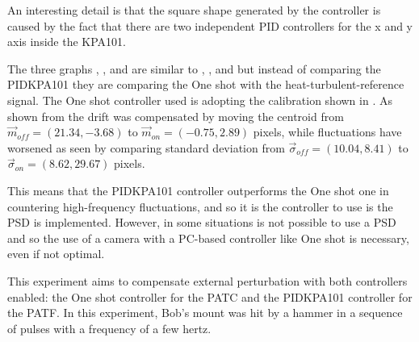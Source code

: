 An interesting detail is that the square shape generated by the controller is caused by the fact that there are two independent PID controllers for the x and y axis inside the KPA101.


The three graphs , , and  are similar to , , and  but instead of comparing the PIDKPA101 they are comparing the One shot with the heat-turbulent-reference signal. The One shot controller used is adopting the calibration shown in .
As shown from  the drift was compensated by moving the centroid from $\vec{m}_{off} = (21.34, -3.68)$ to $\vec{m}_{on} = (-0.75, 2.89)$ pixels, while fluctuations have worsened as seen by comparing standard deviation from $\vec{\sigma}_{off} = (10.04, 8.41)$ to $\vec{\sigma}_{on} = (8.62, 29.67)$ pixels.

This means that the PIDKPA101 controller outperforms the One shot one in countering high-frequency fluctuations, and so it is the controller to use is the PSD is implemented. However, in some situations is not possible to use a PSD and so the use of a camera with a PC-based controller like One shot is necessary, even if not optimal.

This experiment aims to compensate external perturbation with both controllers enabled: the One shot controller for the PATC and the PIDKPA101 controller for the PATF.
In this experiment, Bob’s mount was hit by a hammer in a sequence of pulses with a frequency of a few hertz.

